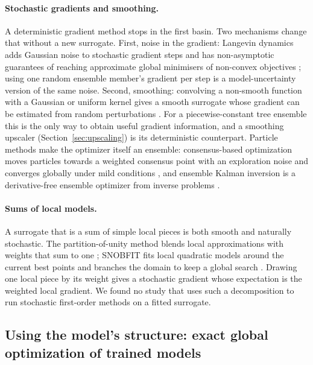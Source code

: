 \paragraph{Stochastic gradients and smoothing.}
A deterministic gradient method stops in the first basin. Two mechanisms change that without a new surrogate. First,
noise in the gradient: Langevin dynamics adds Gaussian noise to stochastic gradient steps and has non-asymptotic
guarantees of reaching approximate global minimisers of non-convex objectives \cite{raginsky2017nonconvex}; using one
random ensemble member's gradient per step is a model-uncertainty version of the same noise. Second, smoothing:
convolving a non-smooth function with a Gaussian or uniform kernel gives a smooth surrogate whose gradient can be
estimated from random perturbations \cite{nesterov2017random,duchi2012randomized}. For a piecewise-constant tree
ensemble this is the only way to obtain useful gradient information, and a smoothing upscaler
(Section~\ref{sec:upscaling}) is its deterministic counterpart. Particle methods make the optimizer itself an
ensemble: consensus-based optimization moves particles towards a weighted consensus point with an exploration noise
\cite{pinnau2017consensus} and converges globally under mild conditions \cite{fornasier2024consensus}, and ensemble
Kalman inversion is a derivative-free ensemble optimizer from inverse problems \cite{iglesias2013ensemble}.

\paragraph{Sums of local models.}
A surrogate that is a sum of simple local pieces is both smooth and naturally stochastic. The partition-of-unity
method blends local approximations with weights that sum to one \cite{babuska1997partition}; SNOBFIT fits local
quadratic models around the current best points and branches the domain to keep a global search
\cite{huyer2008snobfit}. Drawing one local piece by its weight gives a stochastic gradient whose expectation is the
weighted local gradient. We found no study that uses such a decomposition to run stochastic first-order methods on a
fitted surrogate.

\subsection{Using the model's structure: exact global optimization of trained models}


